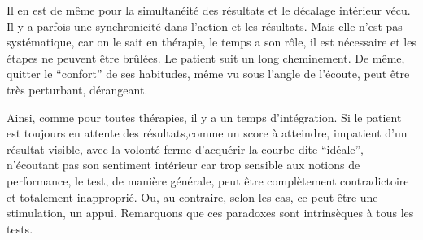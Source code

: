 Il en est de même pour la simultanéité des
résultats et le décalage intérieur vécu. Il y a parfois une
synchronicité dans l'action et les résultats. Mais elle n'est pas systématique,
car on le sait en thérapie, le temps a son rôle, il est
nécessaire et les étapes ne peuvent être brûlées. Le patient
suit un long
cheminement. %
De même, quitter le ``confort'' de ses habitudes, même vu sous
l'angle de l'écoute, peut être très perturbant, dérangeant.

Ainsi, comme pour toutes thérapies, il y a un temps d'intégration. Si
le patient est toujours en
attente des résultats,comme un score à atteindre, impatient d'un résultat visible,
avec la volonté ferme d'acquérir la courbe dite ``idéale'', n'écoutant pas son
sentiment intérieur car trop sensible aux notions de performance,
le test, de manière générale, peut être complètement
contradictoire et totalement inapproprié.
Ou, au contraire, selon les cas, ce peut être une stimulation, un appui.
Remarquons que ces paradoxes sont
intrinsèques à tous les tests.





